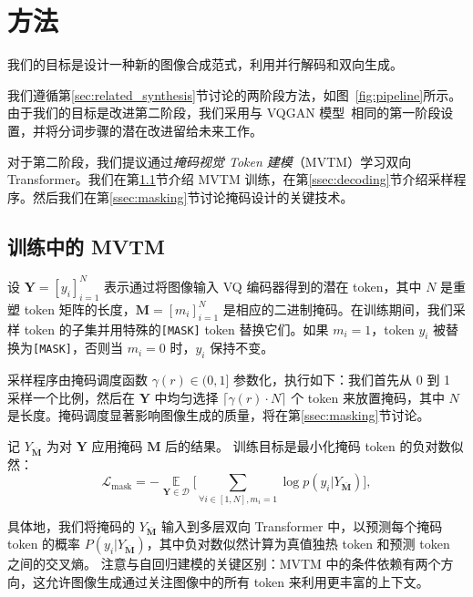 
\section{方法}
\label{sec:method}
我们的目标是设计一种新的图像合成范式，利用并行解码和双向生成。

我们遵循第\ref{sec:related_synthesis}节讨论的两阶段方法，如图~\ref{fig:pipeline}所示。由于我们的目标是改进第二阶段，我们采用与 VQGAN 模型~\cite{Esser21vqgan}相同的第一阶段设置，并将分词步骤的潜在改进留给未来工作。

对于第二阶段，我们提议通过\textit{掩码视觉 Token 建模}（MVTM）学习双向 Transformer。我们在第\ref{ssec:model}节介绍 MVTM 训练，在第\ref{ssec:decoding}节介绍采样程序。然后我们在第\ref{ssec:masking}节讨论掩码设计的关键技术。 


\subsection{训练中的 MVTM}
\label{ssec:model}
\newcommand{\unknownmask}[0]{{\mathbf{M}}}
\newcommand{\mathy}[0]{{\mathbf{Y}}}
\newcommand{\knownmask}[0]{{\overline{\mathbf{M}}}}
设 $\mathy=[y_i]_{i=1}^N$ 表示通过将图像输入 VQ 编码器得到的潜在 token，其中 $N$ 是重塑 token 矩阵的长度，$\unknownmask=[m_i]_{i=1}^N$ 是相应的二进制掩码。在训练期间，我们采样 token 的子集并用特殊的\texttt{[MASK]} token 替换它们。如果 $m_i=1$，token $y_i$ 被替换为\texttt{[MASK]}，否则当 $m_i=0$ 时，$y_i$ 保持不变。

采样程序由掩码调度函数 $\gamma(r) \in (0,1]$ 参数化，执行如下：我们首先从 0 到 1 采样一个比例，然后在 $\mathy$ 中均匀选择 $\lceil \gamma(r) \cdot N \rceil$ 个 token 来放置掩码，其中 $N$ 是长度。掩码调度显著影响图像生成的质量，将在第\ref{ssec:masking}节讨论。

记 $Y_{\knownmask}$ 为对 $\mathy$ 应用掩码 $\unknownmask$ 后的结果。
训练目标是最小化掩码 token 的负对数似然：
\begin{equation}
\label{eq:loss}
\mathcal{L}_{\text{mask}} = - \mathop{\mathbb{E}} \limits_{\mathy  \in \mathcal{D}} \Big[ \sum_{\forall i \in [1,N], m_i=1} \log p(y_i| Y_{\knownmask}) \Big],
\end{equation}

\noindent 具体地，我们将掩码的 $Y_{\knownmask}$ 输入到多层双向 Transformer 中，以预测每个掩码 token 的概率 $P(y_i | Y_{\knownmask})$，其中负对数似然计算为真值独热 token 和预测 token 之间的交叉熵。
注意与自回归建模的关键区别：MVTM 中的条件依赖有两个方向，这允许图像生成通过关注图像中的所有 token 来利用更丰富的上下文。


